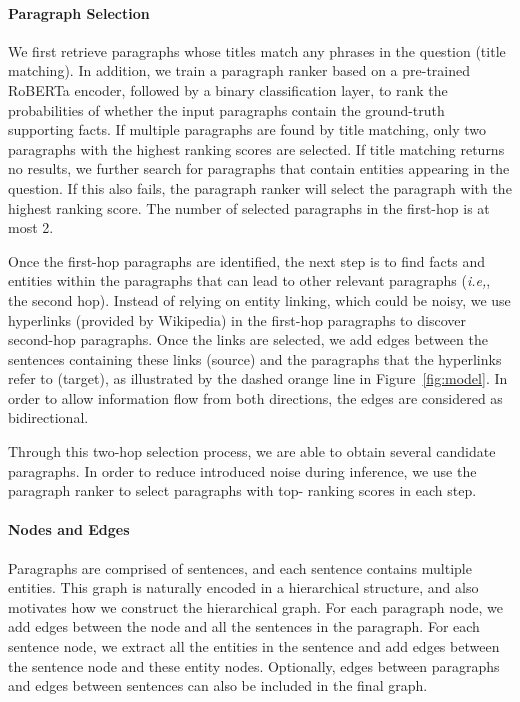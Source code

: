 \documentclass[11pt,a4paper]{article}
\begin{document}
\paragraph{Paragraph Selection}
We first retrieve paragraphs whose titles match any phrases in the question (title matching). In addition, we train a paragraph ranker based on a pre-trained RoBERTa encoder, followed by a binary classification layer, to rank the probabilities of whether the input paragraphs contain the ground-truth supporting facts. If multiple paragraphs are found by title matching, only two paragraphs with the highest ranking scores are selected.
If title matching returns no results, we further search for paragraphs that contain entities appearing in the question. If this also fails, the paragraph ranker will select the paragraph with the highest ranking score. The number of selected paragraphs in the first-hop is at most 2.

Once the first-hop paragraphs are identified, the next step is to find facts and entities within the paragraphs that can lead to other relevant paragraphs (\emph{i.e,}, the second hop). Instead of relying on entity linking, which could be noisy, we use hyperlinks (provided by Wikipedia) in the first-hop paragraphs to discover second-hop paragraphs. Once the links are selected, we add edges between the sentences containing these links (source) and the paragraphs that the hyperlinks refer to (target), as illustrated by the dashed orange line in Figure~\ref{fig:model}. In order to allow information flow from both directions, the edges are considered as bidirectional.

Through this two-hop selection process, we are able to obtain several candidate paragraphs. In order to reduce introduced noise during inference, we use the paragraph ranker to select paragraphs with top- ranking scores in each step. 

\paragraph{Nodes and Edges}
Paragraphs are comprised of sentences, and each sentence contains multiple entities. This graph is naturally encoded in a hierarchical structure, and also motivates how we construct the hierarchical graph. For each paragraph node, we add edges between the node and all the sentences in the paragraph. For each sentence node, we extract all the entities in the sentence and add edges between the sentence node and these entity nodes. Optionally, edges between paragraphs and edges between sentences can also be included in the final graph.
\end{document}
